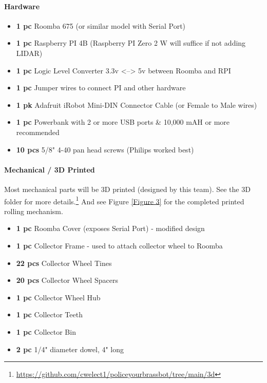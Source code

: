 \documentclass{scrarticle}
\begin{document}
\paragraph{Hardware}
\begin{itemize}
    \item \textbf{1 pc} Roomba 675 (or similar model with Serial Port)
    \item \textbf{1 pc} Raspberry PI 4B (Raspberry PI Zero 2 W will suffice if not adding LIDAR)
    \item \textbf{1 pc} Logic Level Converter 3.3v <--> 5v between Roomba and RPI
    \item \textbf{1 pc} Jumper wires to connect PI and other hardware
    \item \textbf{1 pk} Adafruit iRobot Mini-DIN Connector Cable (or Female to Male wires)
    \item \textbf{1 pc} Powerbank with 2 or more USB ports \& 10,000 mAH or more recommended
    \item \textbf{10 pcs} 5/8" 4-40 pan head screws (Philips worked best)
\end{itemize}

\paragraph{Mechanical / 3D Printed}
Most mechanical parts will be 3D printed (designed by this team). See the 3D folder for more details.\footnote{\href{https://github.com/cwelect1/policeyourbrassbot/tree/main/3d}{https://github.com/cwelect1/policeyourbrassbot/tree/main/3d}} And see Figure \ref{Figure 3} for the completed printed rolling mechanism.
\begin{itemize}
    \item \textbf{1 pc} Roomba Cover (exposes Serial Port) - modified design
    \item \textbf{1 pc} Collector Frame - used to attach collector wheel to Roomba
    \item \textbf{22 pcs} Collector Wheel Tines
    \item \textbf{20 pcs} Collector Wheel Spacers
    \item \textbf{1 pc} Collector Wheel Hub
    \item \textbf{1 pc} Collector Teeth
    \item \textbf{1 pc} Collector Bin
    \item \textbf{2 pc} 1/4" diameter dowel, 4" long
\end{itemize}
\end{document}
